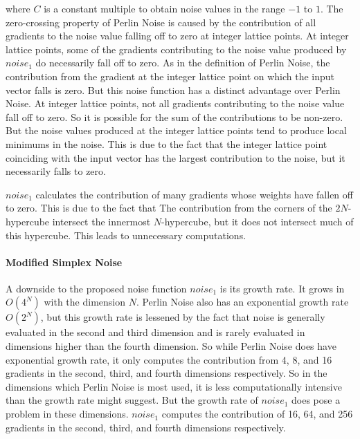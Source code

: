 \documentclass[12pt]{article}
\theoremstyle{definition}
\theoremstyle{remark}
\begin{document}
where $C$ is a constant multiple to obtain noise values in the range $-1$ to $1$. The zero-crossing property of Perlin Noise is caused by the contribution of all gradients to the noise value falling off to zero at integer lattice points. At integer lattice points, some of the gradients contributing to the noise value produced by $noise_1$ do necessarily fall off to zero. As in the definition of Perlin Noise, the contribution from the gradient at the integer lattice point on which the input vector falls is zero. But this noise function has a distinct advantage over Perlin Noise. At integer lattice points, not all gradients contributing to the noise value fall off to zero. So it is possible for the sum of the contributions to be non-zero. But the noise values produced at the integer lattice points tend to produce local minimums in the noise. This is due to the fact that the integer lattice point coinciding with the input vector has the largest contribution to the noise, but it necessarily falls to zero.

$noise_1$ calculates the contribution of many gradients whose weights have fallen off to zero. This is due to the fact that The contribution from the corners of the $2N$-hypercube intersect the innermost $N$-hypercube, but it does not intersect much of this hypercube. This leads to unnecessary computations. 

\paragraph{Modified Simplex Noise}

A downside to the proposed noise function $noise_1$ is its growth rate. It grows in $O(4^N)$ with the dimension $N$. Perlin Noise also has an exponential growth rate $O(2^N)$, but this growth rate is lessened by the fact that noise is generally evaluated in the second and third dimension and is rarely evaluated in dimensions higher than the fourth dimension. So while Perlin Noise does have exponential growth rate, it only computes the contribution from 4, 8, and 16 gradients in the second, third, and fourth dimensions respectively. So in the dimensions which Perlin Noise is most used, it is less computationally intensive than the growth rate might suggest. But the growth rate of $noise_1$ does pose a problem in these dimensions. $noise_1$ computes the contribution of 16, 64, and 256 gradients in the second, third, and fourth dimensions respectively.
\end{document}
